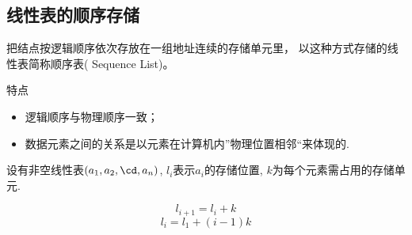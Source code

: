\subsection{线性表的顺序存储}
\begin{frame}\ft{\subsecname}
\begin{dingyi}[顺序存储]
把结点按逻辑顺序依次存放在一组地址连续的存储单元里， 
以这种方式存储的线性表简称顺序表( Sequence List)。
\end{dingyi}

\pause 
\textcolor{acolor5}{特点}
\begin{itemize}
\item
逻辑顺序与物理顺序一致；
\item
数据元素之间的关系是以元素在计算机内”物理位置相邻“来体现的. 
\end{itemize}
\end{frame}

\begin{frame}\ft{\subsecname}
设有非空线性表$(a_1,a_2,\cd,a_n)$,  $l_i$表示$a_i$的存储位置,  $k$为每个元素需占用的存储单元. 

$$
l_{i+1}=l_{i}+k
$$
$$
l_{i}=l_{1}+(i-1)k
$$
\end{frame}


